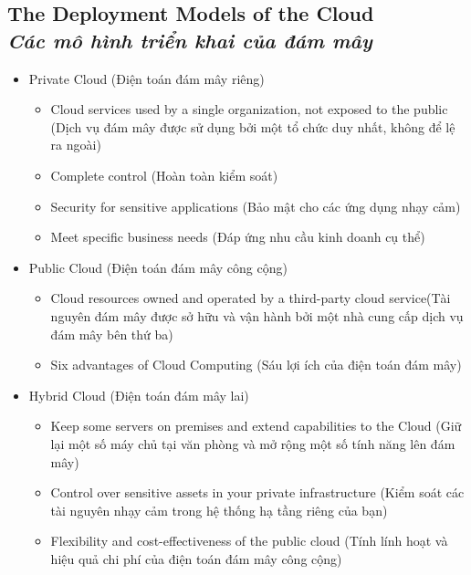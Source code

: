 \subsection[The Deployment Models of the Cloud]{\textbf{The Deployment Models of the Cloud} \\ \textit{Các mô hình triển khai của đám mây}}
\begin{itemize}
	\item Private Cloud (Điện toán đám mây riêng)
	\begin{itemize}
		\item Cloud services used by a single organization, not exposed to the public (Dịch vụ đám mây được sử dụng bởi một tổ chức duy nhất, không để lệ ra ngoài)
		\item Complete control (Hoàn toàn kiểm soát)
		\item Security for sensitive applications (Bảo mật cho các ứng dụng nhạy cảm)
		\item Meet specific business needs (Đáp ứng nhu cầu kinh doanh cụ thể)
	\end{itemize}
	\item Public Cloud (Điện toán đám mây công cộng)
	\begin{itemize}
		\item Cloud resources owned and operated by a third-party cloud service(Tài nguyên đám mây được sở hữu và vận hành bởi một nhà cung cấp dịch vụ đám mây bên thứ ba)
		\item Six advantages of Cloud Computing (Sáu lợi ích của điện toán đám mây)
	\end{itemize}
	\item Hybrid Cloud (Điện toán đám mây lai)
	\begin{itemize}
		\item Keep some servers on premises and extend capabilities to the Cloud (Giữ lại một số máy chủ tại văn phòng và mở rộng một số tính năng lên đám mây)
		\item Control over sensitive assets in your private infrastructure (Kiểm soát các tài nguyên nhạy cảm trong hệ thống hạ tầng riêng của bạn)
		\item Flexibility and cost-effectiveness of the public cloud (Tính lính hoạt và hiệu quả chi phí của điện toán đám mây công cộng)
	\end{itemize}
\end{itemize}

